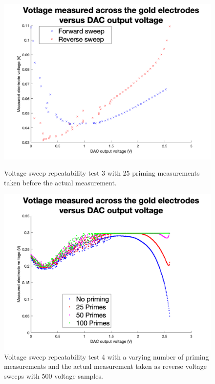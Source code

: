 \begin{figure}[ht]
    \begin{minipage}{0.5\textwidth}
        \centering
        \includegraphics[width=\textwidth]{Figures/Testing/Aus5}
        \caption{Voltage sweep repeatability test 3 with 25 priming measurements taken before the actual measurement.}
        \label{fig:test3} %
    \end{minipage}
    \begin{minipage}{0.5\textwidth}
        \centering
        \includegraphics[width=\textwidth]{Figures/Testing/Aus7}
        \caption{Voltage sweep repeatability test 4 with a varying number of priming measurements and the actual measurement taken as reverse voltage sweeps with 500 voltage samples.}
        \label{fig:test4} %
    \end{minipage}
\end{figure}

